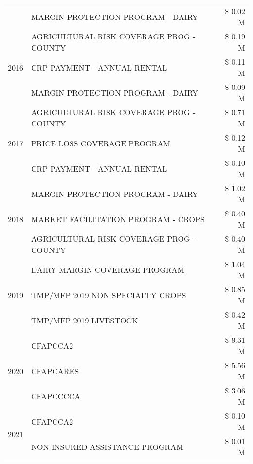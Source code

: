 \begin{tabular}{llr}
 & MARGIN PROTECTION PROGRAM - DAIRY & \$ 0.02 M \\
\cline{1-3}
\multirow[t]{3}{*}{2016} & AGRICULTURAL RISK COVERAGE PROG - COUNTY & \$ 0.19 M \\
 & CRP PAYMENT - ANNUAL RENTAL & \$ 0.11 M \\
 & MARGIN PROTECTION PROGRAM - DAIRY & \$ 0.09 M \\
\cline{1-3}
\multirow[t]{3}{*}{2017} & AGRICULTURAL RISK COVERAGE PROG - COUNTY & \$ 0.71 M \\
 & PRICE LOSS COVERAGE PROGRAM & \$ 0.12 M \\
 & CRP PAYMENT - ANNUAL RENTAL & \$ 0.10 M \\
\cline{1-3}
\multirow[t]{3}{*}{2018} & MARGIN PROTECTION PROGRAM - DAIRY & \$ 1.02 M \\
 & MARKET FACILITATION PROGRAM - CROPS & \$ 0.40 M \\
 & AGRICULTURAL RISK COVERAGE PROG - COUNTY & \$ 0.40 M \\
\cline{1-3}
\multirow[t]{3}{*}{2019} & DAIRY MARGIN COVERAGE PROGRAM & \$ 1.04 M \\
 & TMP/MFP 2019 NON SPECIALTY CROPS & \$ 0.85 M \\
 & TMP/MFP 2019 LIVESTOCK & \$ 0.42 M \\
\cline{1-3}
\multirow[t]{3}{*}{2020} & CFAPCCA2 & \$ 9.31 M \\
 & CFAPCARES & \$ 5.56 M \\
 & CFAPCCCCA & \$ 3.06 M \\
\cline{1-3}
\multirow[t]{2}{*}{2021} & CFAPCCA2 & \$ 0.10 M \\
 & NON-INSURED ASSISTANCE PROGRAM & \$ 0.01 M \\
\cline{1-3}
\bottomrule
\end{tabular}
